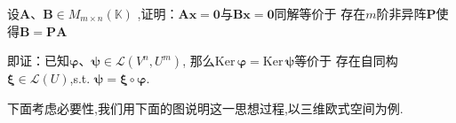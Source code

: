 \begin{brown}
\begin{example}\label{ex:4}
    设$\bm{A}$、$\bm{B}\in M_{m\times n}\left(\mathbb{K}\right)$
    ,证明：$\bm{Ax}=\bm{0}$与$\bm{Bx}=\bm{0}$同解等价于
    存在$m$阶非异阵$\bm{P}$使得$\bm{B}=\bm{PA}$
\end{example}
\begin{Proof}
    即证：已知$\bm{\varphi}$、$\bm{\psi}\in \mathcal{L}\left(V^n,U^m\right)$,
    那么$\mathrm{Ker}\,\bm{\varphi}=\mathrm{Ker}\,\bm{\psi}$等价于
    存在自同构$\bm{\xi}\in \mathcal{L}
    \left(U\right)$,s.t.
    $\bm{\psi}=\bm{\xi}\circ \bm{\varphi}$.

    下面考虑必要性,我们用下面的图说明这一思想过程,以三维欧式空间为例.


\newpage




\begin{tikzpicture}[x=0.75pt,y=0.75pt,yscale=-1,xscale=1]


\end{tikzpicture}
\end{Proof}
\end{brown}
